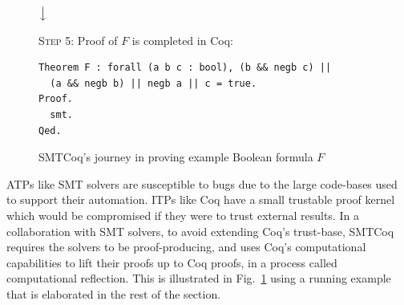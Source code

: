 \documentclass{article}
\begin{document}
\begin{figure}
		\begin{center}
			$\big\downarrow$
		\end{center}
		
		\begin{framed}
			\textsc{Step 5}: Proof of $F$ is 
			completed in Coq:
			\begin{verbatim}
Theorem F : forall (a b c : bool), (b && negb c) || 
  (a && negb b) || negb a || c = true.
Proof.
  smt.
Qed.
			\end{verbatim}
		\end{framed}
		
		\caption{SMTCoq's journey in proving 
			example Boolean formula $F$}
		\label{fig:smtcoqex}
	\end{figure}
	
	ATPs like SMT solvers are susceptible 
	to bugs due to the large code-bases 
	used to support	their automation. 
	ITPs like Coq have a small trustable 
	proof kernel which would be 
	compromised if they were to trust
	external results. In a collaboration
	with SMT solvers, to avoid extending 
	Coq's trust-base, SMTCoq requires the 
	solvers to be proof-producing, and uses 
	Coq's computational capabilities 
	to lift their proofs up to Coq proofs, 
	in a process called computational 
	reflection. This is illustrated in 
	Fig.~\ref{fig:smtcoqex} using a 
	running example that is elaborated 
	in the rest of the section.
	
\end{document}
